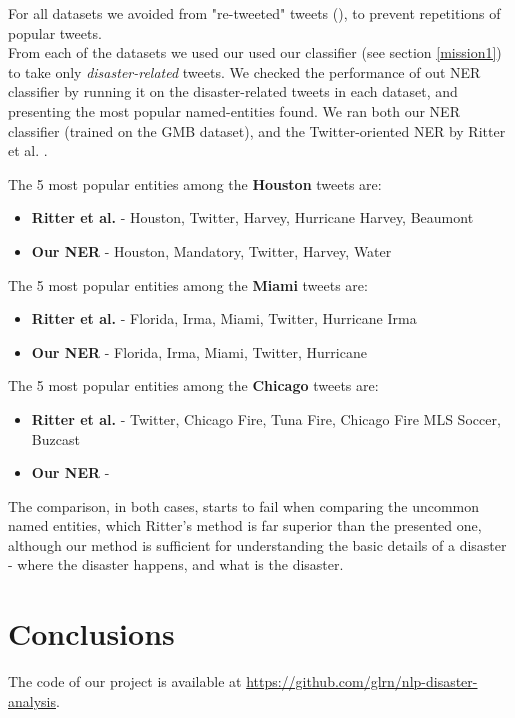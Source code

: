 \documentclass[letterpaper,twocolumn,10pt]{article}
\begin{document}
For all datasets we avoided from "re-tweeted" tweets (), to prevent repetitions of popular tweets.\\

From each of the datasets we used our used our classifier (see section \ref{mission1}) to take only \textit{disaster-related} tweets. We checked the performance of out NER classifier by running it on the disaster-related tweets in each dataset, and presenting the most popular named-entities found. We ran both our NER classifier (trained on the GMB dataset), and the Twitter-oriented NER by Ritter et al. \cite{Ritter11}.

The 5 most popular entities among the \textbf{Houston} tweets are:

\begin{itemize}[noitemsep]
	\item\textbf{Ritter et al.} - Houston, Twitter, Harvey, Hurricane Harvey, Beaumont
	\item\textbf{Our NER} - Houston, Mandatory, Twitter, Harvey, Water
\end{itemize}

The 5 most popular entities among the \textbf{Miami} tweets are:

\begin{itemize}[noitemsep]
	\item\textbf{Ritter et al.} - Florida, Irma, Miami, Twitter, Hurricane Irma
	\item\textbf{Our NER} - Florida, Irma, Miami, Twitter, Hurricane
\end{itemize}

The 5 most popular entities among the \textbf{Chicago} tweets are:

\begin{itemize}[noitemsep]
	\item\textbf{Ritter et al.} - Twitter, Chicago Fire, Tuna Fire, Chicago Fire MLS Soccer, Buzcast
	\item\textbf{Our NER} - 
\end{itemize}

The comparison, in both cases, starts to fail when comparing the uncommon named entities, which Ritter's method is far superior than the presented one, although our method is sufficient for understanding the basic details of a disaster - where the disaster happens, and what is the disaster.


\section{Conclusions}


The code of our project is available at \url{https://github.com/glrn/nlp-disaster-analysis}.



{\footnotesize 
}

\theendnotes
\end{document}
